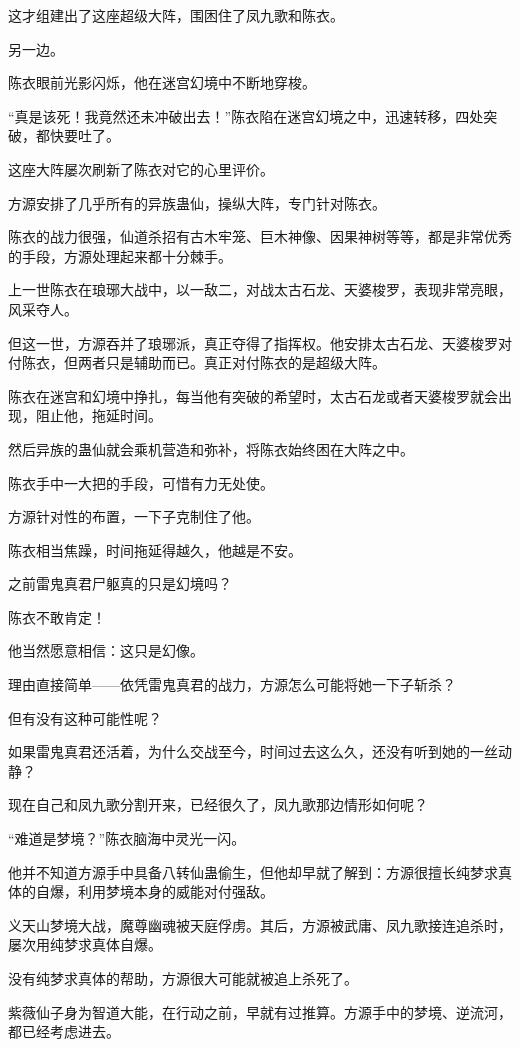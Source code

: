 \begin{this_body}
这才组建出了这座超级大阵，围困住了凤九歌和陈衣。

另一边。

陈衣眼前光影闪烁，他在迷宫幻境中不断地穿梭。

“真是该死！我竟然还未冲破出去！”陈衣陷在迷宫幻境之中，迅速转移，四处突破，都快要吐了。

这座大阵屡次刷新了陈衣对它的心里评价。

方源安排了几乎所有的异族蛊仙，操纵大阵，专门针对陈衣。

陈衣的战力很强，仙道杀招有古木牢笼、巨木神像、因果神树等等，都是非常优秀的手段，方源处理起来都十分棘手。

上一世陈衣在琅琊大战中，以一敌二，对战太古石龙、天婆梭罗，表现非常亮眼，风采夺人。

但这一世，方源吞并了琅琊派，真正夺得了指挥权。他安排太古石龙、天婆梭罗对付陈衣，但两者只是辅助而已。真正对付陈衣的是超级大阵。

陈衣在迷宫和幻境中挣扎，每当他有突破的希望时，太古石龙或者天婆梭罗就会出现，阻止他，拖延时间。

然后异族的蛊仙就会乘机营造和弥补，将陈衣始终困在大阵之中。

陈衣手中一大把的手段，可惜有力无处使。

方源针对性的布置，一下子克制住了他。

陈衣相当焦躁，时间拖延得越久，他越是不安。

之前雷鬼真君尸躯真的只是幻境吗？

陈衣不敢肯定！

他当然愿意相信：这只是幻像。

理由直接简单——依凭雷鬼真君的战力，方源怎么可能将她一下子斩杀？

但有没有这种可能性呢？

如果雷鬼真君还活着，为什么交战至今，时间过去这么久，还没有听到她的一丝动静？

现在自己和凤九歌分割开来，已经很久了，凤九歌那边情形如何呢？

“难道是梦境？”陈衣脑海中灵光一闪。

他并不知道方源手中具备八转仙蛊偷生，但他却早就了解到：方源很擅长纯梦求真体的自爆，利用梦境本身的威能对付强敌。

义天山梦境大战，魔尊幽魂被天庭俘虏。其后，方源被武庸、凤九歌接连追杀时，屡次用纯梦求真体自爆。

没有纯梦求真体的帮助，方源很大可能就被追上杀死了。

紫薇仙子身为智道大能，在行动之前，早就有过推算。方源手中的梦境、逆流河，都已经考虑进去。


\end{this_body}
